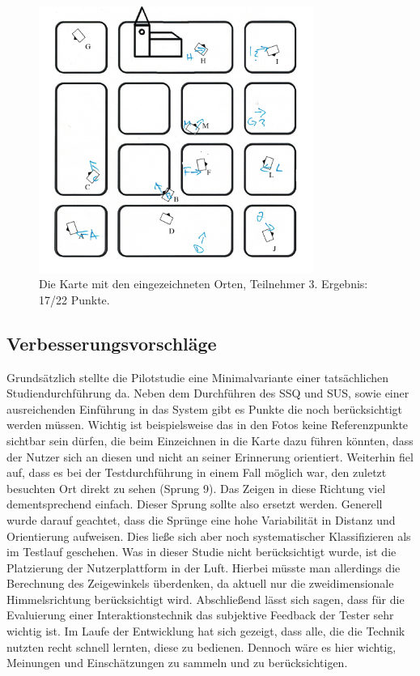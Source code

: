 \begin{figure}[]
  \centering
  \includegraphics[width=0.8\textwidth]{images/map_full_with_curch_c.png}
  \caption{Die Karte mit den eingezeichneten Orten, Teilnehmer 3. Ergebnis: 17/22 Punkte.}
  \label{fig:todo}
\end{figure}


\subsection{Verbesserungsvorschläge}
Grundsätzlich stellte die Pilotstudie eine Minimalvariante einer tatsächlichen Studiendurchführung da. Neben dem Durchführen des SSQ und SUS, sowie einer ausreichenden Einführung in das System gibt es Punkte die noch berücksichtigt werden müssen.
Wichtig ist beispielsweise das in den Fotos keine Referenzpunkte sichtbar sein dürfen, die beim Einzeichnen in die Karte dazu führen könnten, dass der Nutzer sich an diesen und nicht an seiner Erinnerung orientiert. Weiterhin fiel auf, dass es bei der Testdurchführung in einem Fall möglich war, den zuletzt besuchten Ort direkt zu sehen (Sprung 9). Das Zeigen in diese Richtung viel dementsprechend einfach. Dieser Sprung sollte also ersetzt werden.
Generell wurde darauf geachtet, dass die Sprünge eine hohe Variabilität in Distanz und Orientierung aufweisen. Dies ließe sich aber noch systematischer Klassifizieren als im Testlauf geschehen.
Was in dieser Studie nicht berücksichtigt wurde, ist die Platzierung der Nutzerplattform in der Luft. Hierbei müsste man allerdings die Berechnung des Zeigewinkels überdenken, da aktuell nur die zweidimensionale Himmelsrichtung berücksichtigt wird.
Abschließend lässt sich sagen, dass für die Evaluierung einer Interaktionstechnik das subjektive Feedback der Tester sehr wichtig ist. Im Laufe der Entwicklung hat sich gezeigt, dass alle, die die Technik nutzten recht schnell lernten, diese zu bedienen. Dennoch wäre es hier wichtig, Meinungen und Einschätzungen zu sammeln und zu berücksichtigen.

